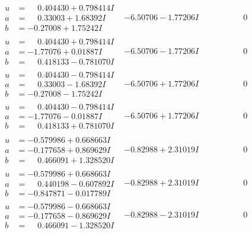 \documentclass[1p]{elsarticle_modified}
\theoremstyle{definition}
\begin{document}
$$\begin{array}{c|c|c}
\begin{aligned}
u &= \phantom{-}0.404430 + 0.798414 I \\
a &= \phantom{-}0.33003 + 1.68392 I \\
b &= -0.27008 + 1.75242 I\end{aligned}
 & -6.50706 - 1.77206 I & \phantom{-0.000000 } 0 \\ \hline\begin{aligned}
u &= \phantom{-}0.404430 + 0.798414 I \\
a &= -1.77076 + 0.01887 I \\
b &= \phantom{-}0.418133 - 0.781070 I\end{aligned}
 & -6.50706 - 1.77206 I & \phantom{-0.000000 } 0 \\ \hline\begin{aligned}
u &= \phantom{-}0.404430 - 0.798414 I \\
a &= \phantom{-}0.33003 - 1.68392 I \\
b &= -0.27008 - 1.75242 I\end{aligned}
 & -6.50706 + 1.77206 I & \phantom{-0.000000 } 0 \\ \hline\begin{aligned}
u &= \phantom{-}0.404430 - 0.798414 I \\
a &= -1.77076 - 0.01887 I \\
b &= \phantom{-}0.418133 + 0.781070 I\end{aligned}
 & -6.50706 + 1.77206 I & \phantom{-0.000000 } 0 \\ \hline\begin{aligned}
u &= -0.579986 + 0.668663 I \\
a &= -0.177658 + 0.869629 I \\
b &= \phantom{-}0.466091 + 1.328520 I\end{aligned}
 & -0.82988 + 2.31019 I & \phantom{-0.000000 } 0 \\ \hline\begin{aligned}
u &= -0.579986 + 0.668663 I \\
a &= \phantom{-}0.440198 - 0.607892 I \\
b &= -0.847871 - 0.017789 I\end{aligned}
 & -0.82988 + 2.31019 I & \phantom{-0.000000 } 0 \\ \hline\begin{aligned}
u &= -0.579986 - 0.668663 I \\
a &= -0.177658 - 0.869629 I \\
b &= \phantom{-}0.466091 - 1.328520 I\end{aligned}
 & -0.82988 - 2.31019 I & \phantom{-0.000000 } 0 \\ \hline\begin{aligned}

\end{aligned}
\end{array}$$
\end{document}
